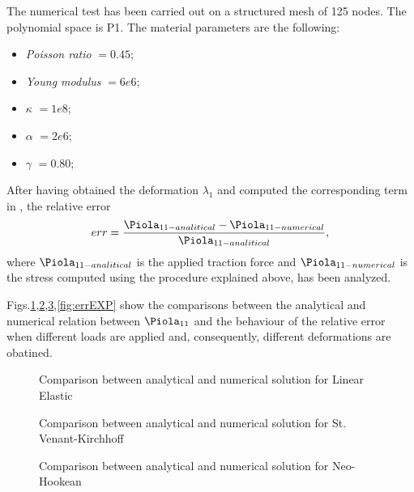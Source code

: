 The numerical test has been carried out on a
structured mesh of 125 nodes. The polynomial space is P1. The material
parameters are the following:
\begin{itemize}
\item \textit{Poisson ratio} $= 0.45$;
\item \textit{Young modulus} $= 6e6$;
\item $\kappa$ $=1e8$;
\item $\alpha$ $=2e6$;
\item $\gamma$ $=0.80$;
\end{itemize}
After having obtained the deformation $\lambda_1$ and
computed the corresponding term in \Piola{}, the relative error
\begin{equation} err = \displaystyle
  \frac{\Piola_{11-analitical}-\Piola_{11-numerical}}{\Piola_{11-analitical}},
\end{equation}
where $\Piola_{11-analitical}$ is the applied traction
force and $\Piola_{11-numerical}$ is the stress computed using the
procedure explained above, has been analyzed.

Figs.\ref{fig:errLE},\ref{fig:errSVK},\ref{fig:errNH},\ref{fig:errEXP}
show the comparisons between the analytical and numerical relation
between $\Piola_{11}$ and the behaviour of the relative error when
different loads are applied and, consequently, different deformations
are obatined.

\begin{figure}[h!]
  \centering
  \caption{Comparison between analytical and numerical solution for
    Linear Elastic}
  \label{fig:errLE}
\end{figure}

\begin{figure}[h!]
  \centering
  \caption{Comparison between analytical and numerical solution for
    St. Venant-Kirchhoff}
  \label{fig:errSVK}
\end{figure}

\begin{figure}[h!]
  \centering
  \caption{Comparison between analytical and numerical solution for
    Neo-Hookean}
  \label{fig:errNH}
\end{figure}

